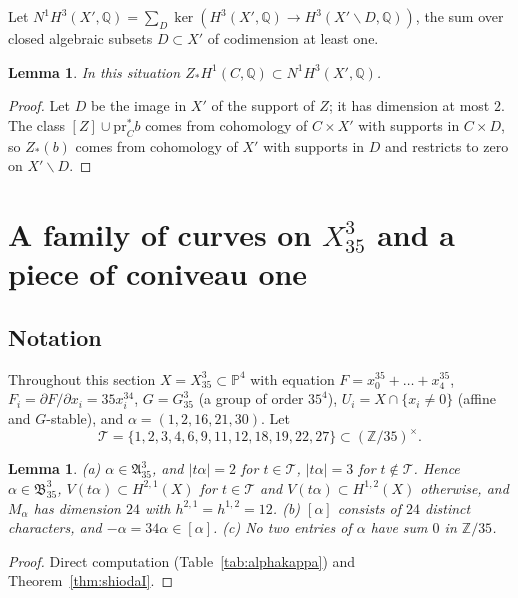 \documentclass[11pt]{amsart}
\newtheorem{lemma}[theorem]{Lemma}
\theoremstyle{definition}
\theoremstyle{remark}
\numberwithin{equation}{section}
\newcommand{\Q}{\mathbb{Q}}
\newcommand{\Z}{\mathbb{Z}}
\newcommand{\PP}{\mathbb{P}}
\newcommand{\fA}{\mathfrak{A}}
\newcommand{\fB}{\mathfrak{B}}
\newcommand{\cT}{\mathcal{T}}
\newcommand{\pr}{\mathrm{pr}}
\newcommand{\sm}{\smallsetminus}
\begin{document}
Let $N^1H^3(X',\Q)=\sum_D\ker(H^3(X',\Q)\to H^3(X'\sm D,\Q))$, the sum over closed algebraic subsets $D\subset X'$ of codimension at least one.

\begin{lemma}\label{lem:N1}
In this situation $Z_*H^1(C,\Q)\subset N^1H^3(X',\Q)$.
\end{lemma}

\begin{proof}
Let $D$ be the image in $X'$ of the support of $Z$; it has dimension at most $2$. The class $[Z]\cup\pr_C^*b$ comes from cohomology of $C\times X'$ with supports in $C\times D$, so $Z_*(b)$ comes from cohomology of $X'$ with supports in $D$ and restricts to zero on $X'\sm D$.
\end{proof}

\section{\texorpdfstring{A family of curves on $X^3_{35}$ and a piece of coniveau one}{A family of curves on the Fermat threefold of degree 35 and a piece of coniveau one}}\label{sec:family}

\subsection{Notation}\label{subsec:notation3}
Throughout this section $X=X^3_{35}\subset\PP^4$ with equation $F=x_0^{35}+\dots+x_4^{35}$, $F_i=\partial F/\partial x_i=35x_i^{34}$, $G=G^3_{35}$ (a group of order $35^4$), $U_i=X\cap\{x_i\ne0\}$ (affine and $G$-stable), and $\alpha=(1,2,16,21,30)$. Let
\[
\cT=\{1,2,3,4,6,9,11,12,18,19,22,27\}\subset(\Z/35)^\times .
\]

\begin{lemma}\label{lem:alpha}
(a) $\alpha\in\fA^3_{35}$, and $|t\alpha|=2$ for $t\in\cT$, $|t\alpha|=3$ for $t\notin\cT$. Hence $\alpha\in\fB^3_{35}$, $V(t\alpha)\subset H^{2,1}(X)$ for $t\in\cT$ and $V(t\alpha)\subset H^{1,2}(X)$ otherwise, and $M_\alpha$ has dimension $24$ with $h^{2,1}=h^{1,2}=12$.
(b) $[\alpha]$ consists of $24$ distinct characters, and $-\alpha=34\alpha\in[\alpha]$.
(c) No two entries of $\alpha$ have sum $0$ in $\Z/35$.
\end{lemma}

\begin{proof}
Direct computation (Table~\ref{tab:alphakappa}) and Theorem~\ref{thm:shiodaI}.
\end{proof}
\end{document}
